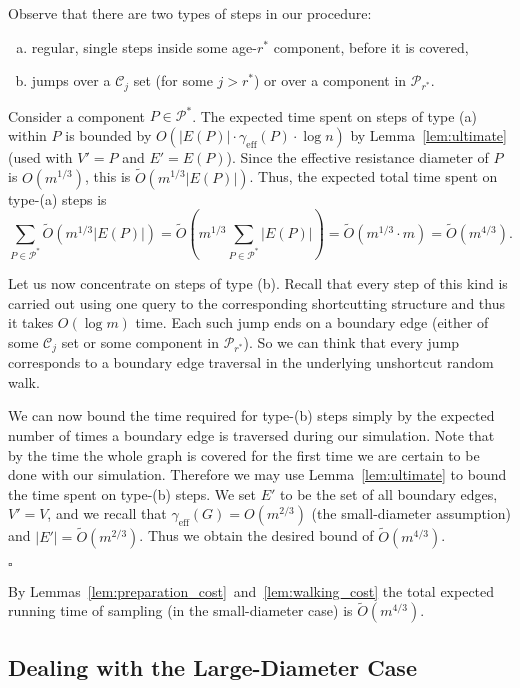 \documentclass[11pt, letterpaper]{article}
\newenvironment{proof}{\noindent{\bf Proof:}\hspace*{1em}}{\qed\bigskip}
\newcommand{\qed}{\hfill\ensuremath{\square}}
\newcommand{\cC}{\mathcal{C}}
\newcommand{\cP}{\mathcal{P}}
\newcommand{\tO}{\widetilde{O}}
\newcommand{\diameff}{\gamma_{\mathrm{eff}}}
\begin{document}
\begin{proof}
Observe that there are two types of steps in our procedure:
\begin{enumerate}[(a)]
\item regular, single steps inside some age-$r^*$ component, before it is covered,
\item jumps over a $\cC_j$ set (for some $j>r^*$) or over a component in $\cP_{r^*}$.
\end{enumerate}
Consider a component $P\in \cP^*$. The expected time spent on steps of type (a) within $P$ is bounded by $O(|E(P)| \cdot \diameff(P) \cdot \log n)$ by Lemma~\ref{lem:ultimate} (used with $V' = P$ and $E' = E(P)$). Since the effective resistance diameter of $P$ is $O(m^{1/3})$, this is $\tO(m^{1/3} |E(P)|)$. Thus, the expected total time spent on type-(a) steps is 
\[
\sum_{P\in \cP^*} \tO(m^{1/3} |E(P)|)=\tO(m^{1/3} \sum_{P\in \cP^*} |E(P)|)=\tO(m^{1/3} \cdot m)=\tO(m^{4/3}).
\]

Let us now concentrate on steps of type (b). Recall that every step of this kind is carried out using one query to the corresponding shortcutting structure and thus it takes $O(\log m)$ time. Each such jump ends on a boundary edge (either of some $\cC_j$ set or some component in $\cP_{r^*}$). So we can think that every jump corresponds to a boundary edge traversal in the underlying unshortcut random walk.

 We can now bound the time required for type-(b) steps simply by the expected number of times a boundary edge is traversed during our simulation. Note that by the time the whole graph is covered for the first time we are certain to be done with our simulation. Therefore we may use Lemma~\ref{lem:ultimate} to bound the time spent on type-(b) steps. We set $E'$ to be the set of all boundary edges, $V' = V$, and we recall that $\diameff(G) = O(m^{2/3})$ (the small-diameter assumption) and $|E'| = \tO(m^{2/3})$. Thus we obtain the desired bound of $\tO(m^{4/3})$. 

\end{proof}

By Lemmas~\ref{lem:preparation_cost}~and~\ref{lem:walking_cost} the total expected running time of sampling (in the small-diameter case) is $\tO(m^{4/3})$.

\subsection{Dealing with the Large-Diameter Case}\label{sec:deadling_with_large_diameter_case}
\end{document}
